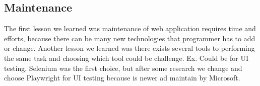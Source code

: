 \subsection{Maintenance}

The first lesson we learned was maintenance of web application requires time and efforts, because there can be many new technologies that programmer has to add or change. 
Another lesson we learned was there exists several tools to performing the same task and choosing which tool could be challenge. 
Ex. Could be for UI testing, Selenium was the first choice, 
but after some research we change and choose Playwright for UI testing because is newer ad maintain by Microsoft.  



